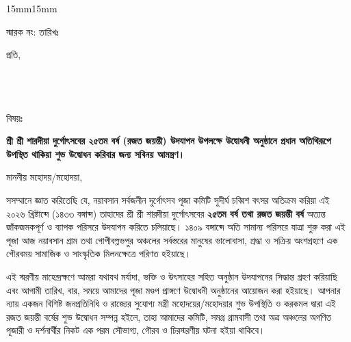 \begin{adjustwidth}{15mm}{15mm}\large

    \noindent স্মারক নং: \RefNo \hfill তারিখঃ \underline{\InvitationDate}

    \vspace{.8cm}
    \noindent প্রতি,\\
    \MinisterSalutationName\\
    \MinisterDesignation\\
    \MinisterGovt\\
    \MinisterAddress

    \vspace{.6cm}
    \noindent\begin{minipage}{.13\linewidth}বিষয়ঃ
    \end{minipage}\begin{minipage}{.82\linewidth}
        \textbf{শ্রী শ্রী শারদীয়া দুর্গোৎসবের ২৫তম বর্ষ (রজত জয়ন্তী) উদযাপন উপলক্ষে উদ্বোধনী অনুষ্ঠানে প্রধান অতিথিরূপে উপস্থিত থাকিয়া শুভ উদ্বোধন করিবার জন্য সবিনয় আমন্ত্রণ।}
    \end{minipage}

    \vspace{.6cm}
    \noindent মাননীয় মহোদয়/মহোদয়া,

    \vspace{.3cm}
    \hspace*{1.5cm} সসম্মানে জ্ঞাত করিতেছি যে, নয়াবসান সর্বজনীন দুর্গোৎসব পূজা কমিটি সুদীর্ঘ চব্বিশ বৎসর অতিক্রম করিয়া এই ২০২৬ খ্রিষ্টাব্দে (১৪৩৩ বঙ্গাব্দ) তাহাদের শ্রী শ্রী শারদীয়া দুর্গোৎসবের \textbf{২৫তম বর্ষ তথা রজত জয়ন্তী বর্ষ} অত্যন্ত জাঁকজমকপূর্ণ ও ব্যাপক পরিসরে উদযাপন করিতে চলিয়াছে। ১৪০৯ বঙ্গাব্দে অতি সামান্য পরিসরে যাত্রা শুরু করা এই পূজা আজ নয়াবসান গ্রাম তথা গোপীবল্লভপুর অঞ্চলের সর্বস্তরের মানুষের ভালোবাসা, শ্রদ্ধা ও সক্রিয় অংশগ্রহণে এক গৌরবময় সামাজিক ও সাংস্কৃতিক মিলনক্ষেত্রে পরিণত হইয়াছে।

    \vspace{.3cm}
    \hspace*{1.5cm} এই স্মরণীয় মাহেন্দ্রক্ষণে আমরা যথাযথ মর্যাদা, ভক্তি ও উৎসাহের সহিত অনুষ্ঠান উদযাপনের সিদ্ধান্ত গ্রহণ করিয়াছি এবং আগামী \EventDateBn তারিখ, \EventDay বার, \EventTime সময়ে আমাদের পূজা মণ্ডপ প্রাঙ্গণে উদ্বোধনী অনুষ্ঠানের আয়োজন করা হইয়াছে। আপনার ন্যায় একজন বিশিষ্ট জনপ্রতিনিধি ও রাজ্যের সুযোগ্য মন্ত্রী মহোদয়ের/মহোদয়ার শুভ উপস্থিতি ও করকমল দ্বারা এই রজত জয়ন্তী বর্ষের শুভ উদ্বোধন সম্পন্ন হইলে, তাহা আমাদের কমিটি, সমগ্র গ্রামবাসী তথা অত্র অঞ্চলের অগণিত পূজারী ও দর্শনার্থীর নিকট এক পরম সৌভাগ্য, গৌরব ও চিরস্মরণীয় ঘটনা হইয়া থাকিবে।


\end{adjustwidth}
